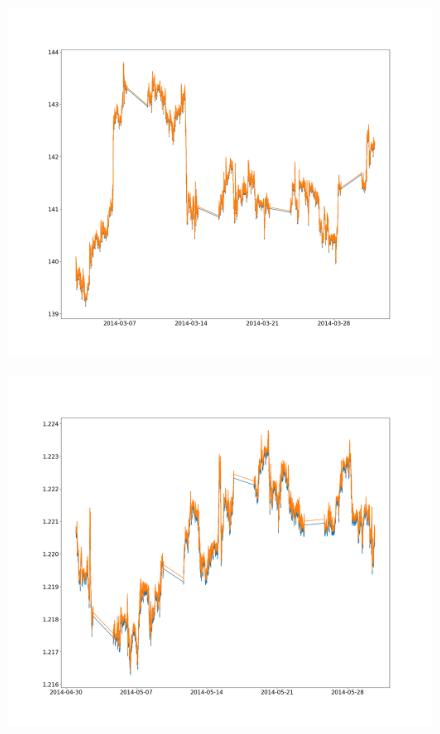 \documentclass[a4paper]{article}
\begin{document}
\begin{figure}[h]
	\centering
	\begin{minipage}{.5\textwidth}
		\centering
		\includegraphics[width=\linewidth]{Figures/strat_1_bad_jpy_14_03}
		\label{fig:7}
	\end{minipage}%
	\begin{minipage}{.5\textwidth}
		\centering
		\includegraphics[width=\linewidth]{Figures/strat_1_good_chf_14_05}
		\label{fig:8}
	\end{minipage}
\end{figure}
\end{document}
